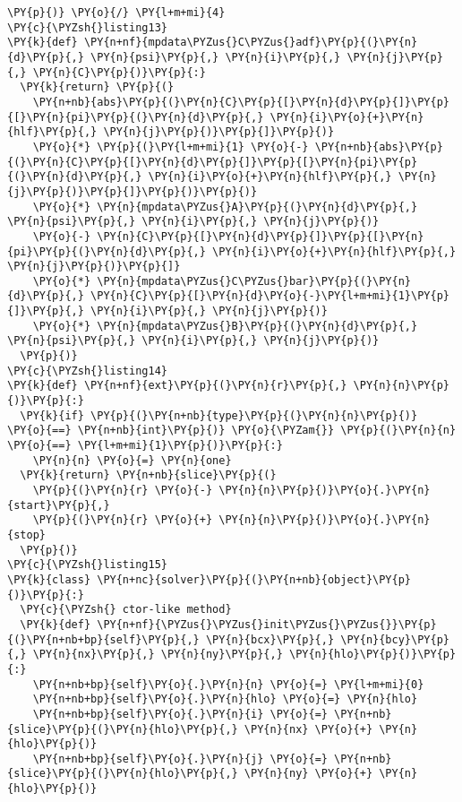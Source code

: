 \begin{Verbatim}[commandchars=\\\{\}]
  \PY{p}{)} \PY{o}{/} \PY{l+m+mi}{4}
\PY{c}{\PYZsh{}listing13}
\PY{k}{def} \PY{n+nf}{mpdata\PYZus{}C\PYZus{}adf}\PY{p}{(}\PY{n}{d}\PY{p}{,} \PY{n}{psi}\PY{p}{,} \PY{n}{i}\PY{p}{,} \PY{n}{j}\PY{p}{,} \PY{n}{C}\PY{p}{)}\PY{p}{:}
  \PY{k}{return} \PY{p}{(}
    \PY{n+nb}{abs}\PY{p}{(}\PY{n}{C}\PY{p}{[}\PY{n}{d}\PY{p}{]}\PY{p}{[}\PY{n}{pi}\PY{p}{(}\PY{n}{d}\PY{p}{,} \PY{n}{i}\PY{o}{+}\PY{n}{hlf}\PY{p}{,} \PY{n}{j}\PY{p}{)}\PY{p}{]}\PY{p}{)} 
    \PY{o}{*} \PY{p}{(}\PY{l+m+mi}{1} \PY{o}{-} \PY{n+nb}{abs}\PY{p}{(}\PY{n}{C}\PY{p}{[}\PY{n}{d}\PY{p}{]}\PY{p}{[}\PY{n}{pi}\PY{p}{(}\PY{n}{d}\PY{p}{,} \PY{n}{i}\PY{o}{+}\PY{n}{hlf}\PY{p}{,} \PY{n}{j}\PY{p}{)}\PY{p}{]}\PY{p}{)}\PY{p}{)} 
    \PY{o}{*} \PY{n}{mpdata\PYZus{}A}\PY{p}{(}\PY{n}{d}\PY{p}{,} \PY{n}{psi}\PY{p}{,} \PY{n}{i}\PY{p}{,} \PY{n}{j}\PY{p}{)}
    \PY{o}{-} \PY{n}{C}\PY{p}{[}\PY{n}{d}\PY{p}{]}\PY{p}{[}\PY{n}{pi}\PY{p}{(}\PY{n}{d}\PY{p}{,} \PY{n}{i}\PY{o}{+}\PY{n}{hlf}\PY{p}{,} \PY{n}{j}\PY{p}{)}\PY{p}{]} 
    \PY{o}{*} \PY{n}{mpdata\PYZus{}C\PYZus{}bar}\PY{p}{(}\PY{n}{d}\PY{p}{,} \PY{n}{C}\PY{p}{[}\PY{n}{d}\PY{o}{-}\PY{l+m+mi}{1}\PY{p}{]}\PY{p}{,} \PY{n}{i}\PY{p}{,} \PY{n}{j}\PY{p}{)}
    \PY{o}{*} \PY{n}{mpdata\PYZus{}B}\PY{p}{(}\PY{n}{d}\PY{p}{,} \PY{n}{psi}\PY{p}{,} \PY{n}{i}\PY{p}{,} \PY{n}{j}\PY{p}{)}
  \PY{p}{)}
\PY{c}{\PYZsh{}listing14}
\PY{k}{def} \PY{n+nf}{ext}\PY{p}{(}\PY{n}{r}\PY{p}{,} \PY{n}{n}\PY{p}{)}\PY{p}{:}
  \PY{k}{if} \PY{p}{(}\PY{n+nb}{type}\PY{p}{(}\PY{n}{n}\PY{p}{)} \PY{o}{==} \PY{n+nb}{int}\PY{p}{)} \PY{o}{\PYZam{}} \PY{p}{(}\PY{n}{n} \PY{o}{==} \PY{l+m+mi}{1}\PY{p}{)}\PY{p}{:} 
    \PY{n}{n} \PY{o}{=} \PY{n}{one}
  \PY{k}{return} \PY{n+nb}{slice}\PY{p}{(}
    \PY{p}{(}\PY{n}{r} \PY{o}{-} \PY{n}{n}\PY{p}{)}\PY{o}{.}\PY{n}{start}\PY{p}{,} 
    \PY{p}{(}\PY{n}{r} \PY{o}{+} \PY{n}{n}\PY{p}{)}\PY{o}{.}\PY{n}{stop}
  \PY{p}{)}
\PY{c}{\PYZsh{}listing15}
\PY{k}{class} \PY{n+nc}{solver}\PY{p}{(}\PY{n+nb}{object}\PY{p}{)}\PY{p}{:}
  \PY{c}{\PYZsh{} ctor-like method}
  \PY{k}{def} \PY{n+nf}{\PYZus{}\PYZus{}init\PYZus{}\PYZus{}}\PY{p}{(}\PY{n+nb+bp}{self}\PY{p}{,} \PY{n}{bcx}\PY{p}{,} \PY{n}{bcy}\PY{p}{,} \PY{n}{nx}\PY{p}{,} \PY{n}{ny}\PY{p}{,} \PY{n}{hlo}\PY{p}{)}\PY{p}{:}
    \PY{n+nb+bp}{self}\PY{o}{.}\PY{n}{n} \PY{o}{=} \PY{l+m+mi}{0}
    \PY{n+nb+bp}{self}\PY{o}{.}\PY{n}{hlo} \PY{o}{=} \PY{n}{hlo}
    \PY{n+nb+bp}{self}\PY{o}{.}\PY{n}{i} \PY{o}{=} \PY{n+nb}{slice}\PY{p}{(}\PY{n}{hlo}\PY{p}{,} \PY{n}{nx} \PY{o}{+} \PY{n}{hlo}\PY{p}{)}
    \PY{n+nb+bp}{self}\PY{o}{.}\PY{n}{j} \PY{o}{=} \PY{n+nb}{slice}\PY{p}{(}\PY{n}{hlo}\PY{p}{,} \PY{n}{ny} \PY{o}{+} \PY{n}{hlo}\PY{p}{)}


\end{Verbatim}
